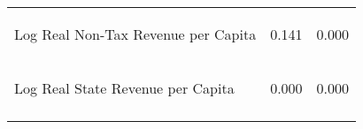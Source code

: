 \begin{center}
\begin{tabular}{lcc}
Log Real Non-Tax Revenue per Capita & \begin{scriptsize}0.141\end{scriptsize} & \begin{scriptsize}0.000\end{scriptsize}\\
Log Real State Revenue per Capita & \begin{scriptsize}0.000\end{scriptsize} & \begin{scriptsize}0.000\end{scriptsize}\\
\noalign{\smallskip}\hline\end{tabular}\\
\end{center}
